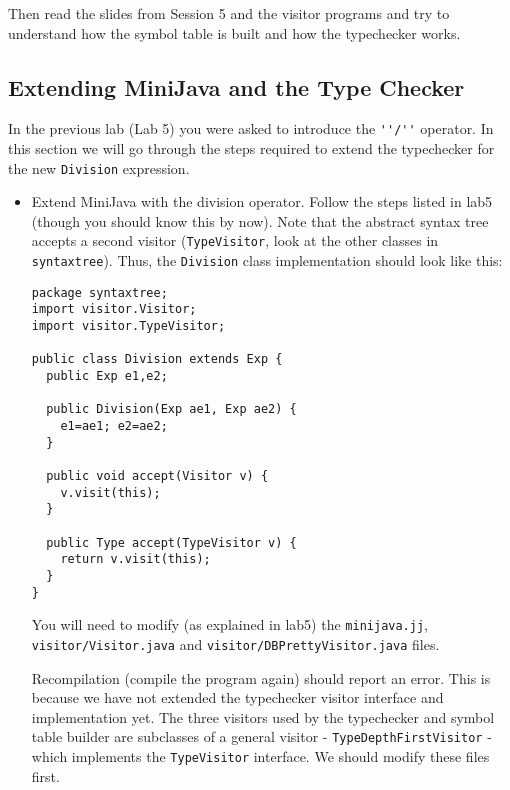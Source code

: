 \documentclass{article}
\begin{document}
Then read the slides from Session 5 and the visitor programs and try to 
understand how the symbol table is built and how the typechecker works.

\subsection*{Extending MiniJava and the Type Checker}

In the previous lab (Lab 5) you were asked to introduce the \verb+''/''+ operator. In this section we will go through the steps required to extend the typechecker for the new \verb+Division+ expression. 

\begin{itemize}

\item Extend MiniJava with the division operator. Follow the steps listed in lab5 (though you should know this by now). Note that the abstract syntax tree accepts a second visitor (\verb+TypeVisitor+, look at the other classes in \verb+syntaxtree+). Thus, the \verb+Division+ class implementation should look like this:

\begin{verbatim}
package syntaxtree;
import visitor.Visitor;
import visitor.TypeVisitor;

public class Division extends Exp {
  public Exp e1,e2;
  
  public Division(Exp ae1, Exp ae2) {
    e1=ae1; e2=ae2;
  }

  public void accept(Visitor v) {
    v.visit(this);
  }

  public Type accept(TypeVisitor v) {
    return v.visit(this);
  }
}
\end{verbatim}

You will need to modify (as explained in lab5) the \verb+minijava.jj+, \verb+visitor/Visitor.java+ and \verb+visitor/DBPrettyVisitor.java+ files.

Recompilation (compile the program again) should report an error. This is because we have not extended the typechecker visitor interface and implementation yet. The three visitors used by the typechecker and symbol table builder are subclasses of a general visitor - \verb+TypeDepthFirstVisitor+ - which implements the \verb+TypeVisitor+ interface. We should modify these files first.


\end{itemize}
\end{document}

